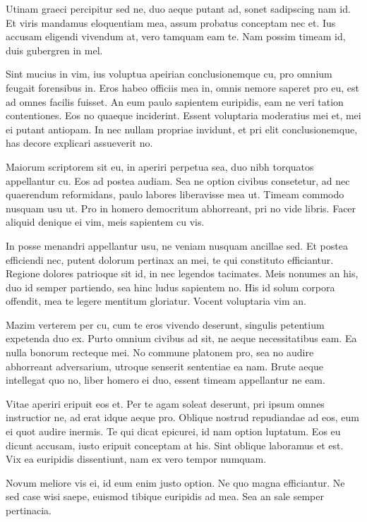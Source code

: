 \documentclass{adhsernotes}
\begin{document}
Utinam graeci percipitur sed ne, duo aeque putant ad, sonet sadipscing nam
id. Et viris mandamus eloquentiam mea, assum probatus conceptam nec et. Ius
accusam eligendi vivendum at, vero tamquam eam te. Nam possim timeam id, duis
gubergren in mel.

Sint mucius in vim, ius voluptua apeirian conclusionemque cu, pro omnium feugait
forensibus in. Eros habeo officiis mea in, omnis nemore saperet pro eu, est ad
omnes facilis fuisset. An eum paulo sapientem euripidis, eam ne veri tation
contentiones. Eos no quaeque inciderint. Essent voluptaria moderatius mei et,
mei ei putant antiopam. In nec nullam propriae invidunt, et pri elit
conclusionemque, has decore explicari assueverit no.

Maiorum scriptorem sit eu, in aperiri perpetua sea, duo nibh torquatos
appellantur cu. Eos ad postea audiam. Sea ne option civibus consetetur, ad nec
quaerendum reformidans, paulo labores liberavisse mea ut. Timeam commodo nusquam
usu ut. Pro in homero democritum abhorreant, pri no vide libris. Facer aliquid
denique ei vim, meis sapientem cu vis.

In posse menandri appellantur usu, ne veniam nusquam ancillae sed. Et postea
efficiendi nec, putent dolorum pertinax an mei, te qui constituto
efficiantur. Regione dolores patrioque sit id, in nec legendos tacimates. Meis
nonumes an his, duo id semper partiendo, sea hinc ludus sapientem no. His id
solum corpora offendit, mea te legere mentitum gloriatur. Vocent voluptaria vim
an.

Mazim verterem per cu, cum te eros vivendo deserunt, singulis petentium
expetenda duo ex. Purto omnium civibus ad sit, ne aeque necessitatibus eam. Ea
nulla bonorum recteque mei. No commune platonem pro, sea no audire abhorreant
adversarium, utroque senserit sententiae ea nam. Brute aeque intellegat quo no,
liber homero ei duo, essent timeam appellantur ne eam.

Vitae aperiri eripuit eos et. Per te agam soleat deserunt, pri ipsum omnes
instructior ne, ad erat idque aeque pro. Oblique nostrud repudiandae ad eos, eum
ei quot audire inermis. Te qui dicat epicurei, id nam option luptatum. Eos eu
dicunt accusam, iusto eripuit conceptam at his. Sint oblique laboramus et
est. Vix ea euripidis dissentiunt, nam ex vero tempor numquam.

Novum meliore vis ei, id eum enim justo option. Ne quo magna efficiantur. Ne sed
case wisi saepe, euismod tibique euripidis ad mea. Sea an sale semper
pertinacia.
\end{document}

